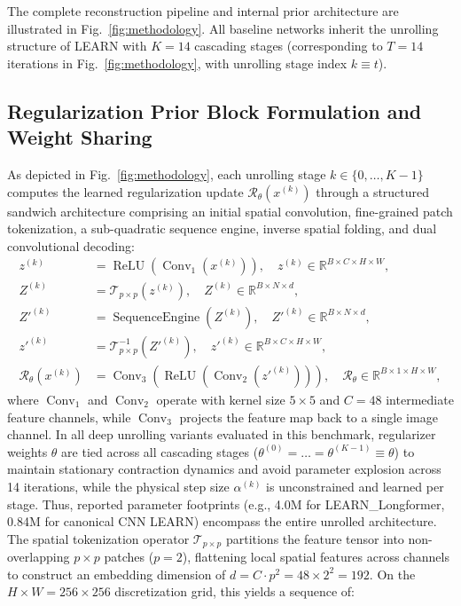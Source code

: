 \documentclass[runningheads]{llncs}
\begin{document}
The complete reconstruction pipeline and internal prior architecture are illustrated in Fig.~\ref{fig:methodology}. All baseline networks inherit the unrolling structure of LEARN with $K = 14$ cascading stages (corresponding to $T = 14$ iterations in Fig.~\ref{fig:methodology}, with unrolling stage index $k \equiv t$). 

\subsection{Regularization Prior Block Formulation and Weight Sharing}
\label{sec:reg_block}

As depicted in Fig.~\ref{fig:methodology}, each unrolling stage $k \in \{0, \dots, K-1\}$ computes the learned regularization update $\mathcal{R}_{\theta}(x^{(k)})$ through a structured sandwich architecture comprising an initial spatial convolution, fine-grained patch tokenization, a sub-quadratic sequence engine, inverse spatial folding, and dual convolutional decoding:
\begin{align}
z^{(k)} &= \operatorname{ReLU}\left(\operatorname{Conv}_1\left(x^{(k)}\right)\right), \quad z^{(k)} \in \mathbb{R}^{B \times C \times H \times W}, \label{eq:reg_conv1} \\
Z^{(k)} &= \mathcal{T}_{p \times p}\left(z^{(k)}\right), \quad Z^{(k)} \in \mathbb{R}^{B \times N \times d}, \label{eq:reg_unfold} \\
Z'^{(k)} &= \operatorname{SequenceEngine}\left(Z^{(k)}\right), \quad Z'^{(k)} \in \mathbb{R}^{B \times N \times d}, \label{eq:reg_engine} \\
z'^{(k)} &= \mathcal{T}_{p \times p}^{-1}\left(Z'^{(k)}\right), \quad z'^{(k)} \in \mathbb{R}^{B \times C \times H \times W}, \label{eq:reg_fold} \\
\mathcal{R}_{\theta}\left(x^{(k)}\right) &= \operatorname{Conv}_3\left(\operatorname{ReLU}\left(\operatorname{Conv}_2\left(z'^{(k)}\right)\right)\right), \quad \mathcal{R}_{\theta} \in \mathbb{R}^{B \times 1 \times H \times W}, \label{eq:reg_conv3}
\end{align}
where $\operatorname{Conv}_1$ and $\operatorname{Conv}_2$ operate with kernel size $5 \times 5$ and $C = 48$ intermediate feature channels, while $\operatorname{Conv}_3$ projects the feature map back to a single image channel. In all deep unrolling variants evaluated in this benchmark, regularizer weights $\theta$ are tied across all cascading stages ($\theta^{(0)} = \dots = \theta^{(K-1)} \equiv \theta$) to maintain stationary contraction dynamics and avoid parameter explosion across 14 iterations, while the physical step size $\alpha^{(k)}$ is unconstrained and learned per stage. Thus, reported parameter footprints (e.g., 4.0M for LEARN\_Longformer, 0.84M for canonical CNN LEARN) encompass the entire unrolled architecture. The spatial tokenization operator $\mathcal{T}_{p \times p}$ partitions the feature tensor into non-overlapping $p \times p$ patches ($p = 2$), flattening local spatial features across channels to construct an embedding dimension of $d = C \cdot p^2 = 48 \times 2^2 = 192$. On the $H \times W = 256 \times 256$ discretization grid, this yields a sequence of:
\end{document}
